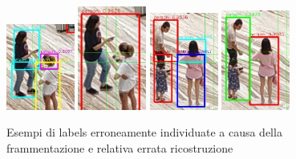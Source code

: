 \begin{figure}
\begin{center}
\includegraphics[width=0.2\textwidth, height=0.25\textheight]{images/esempio-frammentazione-2.jpg}
\includegraphics[width=0.2\textwidth, height=0.25\textheight]{images/esempio-frammentazione-3.jpg}
\includegraphics[width=0.2\textwidth, height=0.25\textheight]{images/esempio-frammentazione-8.jpg}
\includegraphics[width=0.2\textwidth, height=0.25\textheight]{images/esempio-frammentazione-7.jpg}
\end{center}
\caption{Esempi di labels erroneamente individuate a causa della frammentazione e relativa errata ricostruzione}
\end{figure}
